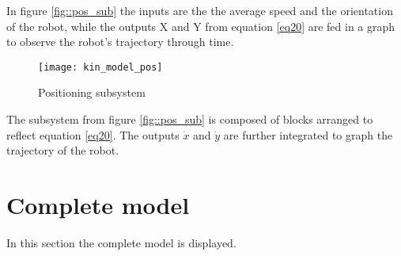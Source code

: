 In figure \ref{fig::pos_sub} the inputs are the the average speed and the orientation of the robot, while the outputs X and Y from equation \ref{eq20} are fed in a graph to observe the robot's trajectory through time. 

\begin{figure}[h]
\centering
\texttt{[image: kin\_model\_pos]}
\caption{Positioning subsystem}
\label{fig::pos_model}
\end{figure} 

The subsystem from figure \ref{fig::pos_sub} is composed of blocks arranged to reflect equation \ref{eq20}. The outputs $\dot{x}$ and $\dot{y}$ are further integrated to graph the trajectory of the robot. 

\section{Complete model}

In this section the complete model is displayed.